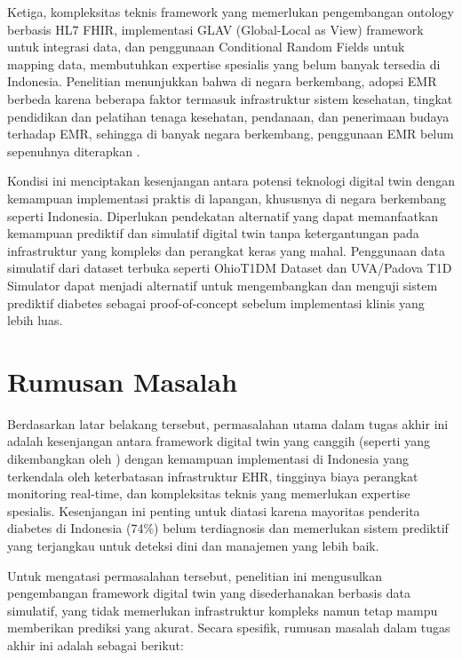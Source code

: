 \documentclass[12pt,a4paper,oneside]{book}
\begin{document}
Ketiga, kompleksitas teknis framework \textcite{Rad2024} yang memerlukan pengembangan ontology berbasis HL7 FHIR, implementasi GLAV (Global-Local as View) framework untuk integrasi data, dan penggunaan Conditional Random Fields untuk mapping data, membutuhkan expertise spesialis yang belum banyak tersedia di Indonesia. Penelitian menunjukkan bahwa di negara berkembang, adopsi EMR berbeda karena beberapa faktor termasuk infrastruktur sistem kesehatan, tingkat pendidikan dan pelatihan tenaga kesehatan, pendanaan, dan penerimaan budaya terhadap EMR, sehingga di banyak negara berkembang, penggunaan EMR belum sepenuhnya diterapkan \autocite{Abodunrin2020}.

Kondisi ini menciptakan kesenjangan antara potensi teknologi digital twin dengan kemampuan implementasi praktis di lapangan, khususnya di negara berkembang seperti Indonesia. Diperlukan pendekatan alternatif yang dapat memanfaatkan kemampuan prediktif dan simulatif digital twin tanpa ketergantungan pada infrastruktur yang kompleks dan perangkat keras yang mahal. Penggunaan data simulatif dari dataset terbuka seperti OhioT1DM Dataset dan UVA/Padova T1D Simulator dapat menjadi alternatif untuk mengembangkan dan menguji sistem prediktif diabetes sebagai proof-of-concept sebelum implementasi klinis yang lebih luas.

\section{Rumusan Masalah}

Berdasarkan latar belakang tersebut, permasalahan utama dalam tugas akhir ini adalah kesenjangan antara framework digital twin yang canggih (seperti yang dikembangkan oleh \textcite{Rad2024}) dengan kemampuan implementasi di Indonesia yang terkendala oleh keterbatasan infrastruktur EHR, tingginya biaya perangkat monitoring real-time, dan kompleksitas teknis yang memerlukan expertise spesialis. Kesenjangan ini penting untuk diatasi karena mayoritas penderita diabetes di Indonesia (74\%) belum terdiagnosis dan memerlukan sistem prediktif yang terjangkau untuk deteksi dini dan manajemen yang lebih baik.

Untuk mengatasi permasalahan tersebut, penelitian ini mengusulkan pengembangan framework digital twin yang disederhanakan berbasis data simulatif, yang tidak memerlukan infrastruktur kompleks namun tetap mampu memberikan prediksi yang akurat. Secara spesifik, rumusan masalah dalam tugas akhir ini adalah sebagai berikut:
\end{document}
